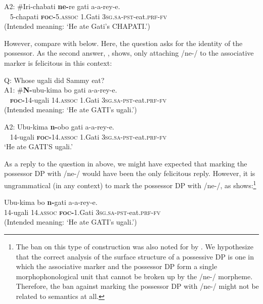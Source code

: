 \documentclass[output=paper,modfonts]{langscibook}
\begin{document}
\ea\label{ex:landmann:36}
\gll A2: \#Iri-chabati \textbf{ne-}re gati a-a-rey-e.\\
    ~ 5-chapati \textsc{\textbf{foc-}}5.\textsc{assoc} 1.Gati \textsc{3sg}.\textsc{sa}-\textsc{pst}-eat.\textsc{prf}-\textsc{fv}\\
\glt (Intended meaning: ‘He ate Gati’s CHAPATI.’)
\z

However, compare  with  below. Here, the question asks for the identity of the possessor. As the second answer, , shows, only attaching /ne-/ to the associative marker is felicitous in this context:

\ea\label{ex:landmann:37}
Q: Whose ugali did Sammy eat?\\
\gll A1: \#\textbf{N-}ubu-kima bo gati a-a-rey-e.\\
    ~ \textsc{\textbf{foc-}}14-ugali 14.\textsc{assoc} 1.Gati \textsc{3sg}.\textsc{sa}-\textsc{pst}-eat.\textsc{prf}-\textsc{fv}\\
\glt (Intended meaning: ‘He ate GATI’s ugali.’)
\z

\ea\label{ex:landmann:38}
\gll A2: Ubu-kima \textbf{n-}obo gati a-a-rey-e.\\
    ~ 14-ugali \textsc{\textbf{foc-}}14.\textsc{assoc} 1.Gati \textsc{3sg}.\textsc{sa}-\textsc{pst}-eat.\textsc{prf}-\textsc{fv}\\
\glt ‘He ate GATI’S ugali.’
\z

As a reply to the question in  above, we might have expected that marking the possessor DP with /ne-/ would have been the only felicitous reply. However, it is ungrammatical (in any context) to mark the possessor DP with /ne-/, as  shows:\footnote{The ban on this type of construction was also noted for  by \citet{AbelsMuriungi2008}. We hypothesize that the correct analysis of the surface structure of a possessive DP is one in which the associative marker and the possessor DP form a single morphophonological unit that cannot be broken up by the /ne-/ morpheme. Therefore, the ban against marking the possessor DP with /ne-/ might not be related to semantics at all.}

\ea\label{ex:landmann:39}
\gll *Ubu-kima bo \textbf{n-}gati a-a-rey-e.\\
     14-ugali 14.\textsc{assoc} \textsc{\textbf{foc-}}1.Gati \textsc{3sg}.\textsc{sa}-\textsc{pst}-eat.\textsc{prf}-\textsc{fv}\\
\glt (Intended meaning: ‘He ate GATI’s ugali.’)
\z
\end{document}
